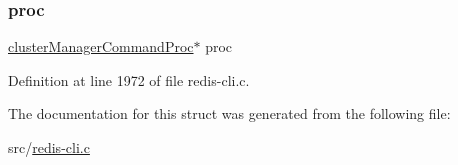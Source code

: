 \subsubsection{\texorpdfstring{proc}{proc}}
{\footnotesize\ttfamily \hyperlink{redis-cli_8c_a8e9cfad74d28bc05c1e55864714a460f}{cluster\+Manager\+Command\+Proc}$\ast$ proc}



Definition at line 1972 of file redis-\/cli.\+c.



The documentation for this struct was generated from the following file\+:\begin{DoxyCompactItemize}
\item 
src/\hyperlink{redis-cli_8c}{redis-\/cli.\+c}\end{DoxyCompactItemize}

